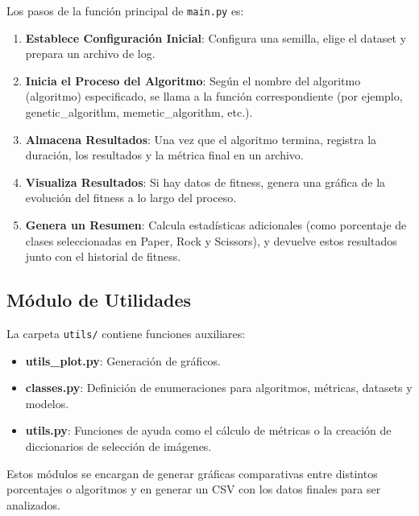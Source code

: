 Los pasos de la función principal de \texttt{main.py} es:
\begin{enumerate}
      \item \textbf{Establece Configuración Inicial}: Configura una semilla, elige el dataset y prepara un archivo de log.
      \item \textbf{Inicia el Proceso del Algoritmo}: Según el nombre del algoritmo (algoritmo) especificado, se llama a
            la función correspondiente (por ejemplo, genetic\_algorithm, memetic\_algorithm, etc.).
      \item \textbf{Almacena Resultados}: Una vez que el algoritmo termina, registra la duración, los resultados y la
            métrica final en un archivo.
      \item \textbf{Visualiza Resultados}: Si hay datos de fitness, genera una gráfica de la evolución del fitness a lo
            largo del proceso.
      \item \textbf{Genera un Resumen}: Calcula estadísticas adicionales (como porcentaje de clases seleccionadas en
            Paper, Rock y Scissors), y devuelve estos resultados junto con el historial de fitness.
\end{enumerate}

\subsection{Módulo de Utilidades}\label{subsec:modulo-de-utilidades}
La carpeta \texttt{utils/} contiene funciones auxiliares:
\begin{itemize}
      \item \textbf{utils\_plot.py}: Generación de gráficos.
      \item \textbf{classes.py}: Definición de enumeraciones para algoritmos, métricas, datasets y modelos.
      \item \textbf{utils.py}: Funciones de ayuda como el cálculo de métricas o la creación de diccionarios de selección de imágenes.
\end{itemize}

Estos módulos se encargan de generar gráficas comparativas entre distintos porcentajes o algoritmos y en
generar un CSV con los datos finales para ser analizados.


